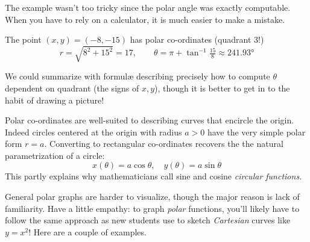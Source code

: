 The example wasn't too tricky since the polar angle was exactly computable. When you have to rely on a calculator, it is much easier to make a mistake.

\begin{example}{}{}
	The point $(x,y)=(-8,-15)$ has polar co-ordinates (quadrant 3!)
	\[
		r=\sqrt{8^2+15^2}=17,\qquad \theta=\pi+\tan^{-1}\tfrac{15}8\approx \ang{241.93}
	\]
\end{example}


We could summarize with formulæ describing precisely how to compute $\theta$ dependent on quadrant (the signs of $x,y$), though it is better to get in to the habit of drawing a picture!

\goodbreak



Polar co-ordinates are well-suited to describing curves that encircle the origin. Indeed circles centered at the origin with radius $a>0$ have the very simple polar form $r=a$. Converting to rectangular co-ordinates recovers the the natural parametrization of a circle:
\[
	x(\theta)=a\cos\theta,\quad y(\theta)=a\sin\theta
\]
This partly explains why mathematicians call sine and cosine \emph{circular functions.}\smallbreak

General polar graphs are harder to visualize, though the major reason is lack of familiarity. Have a little empathy: to graph \emph{polar} functions, you'll likely have to follow the same approach as new students use to sketch \emph{Cartesian} curves like $y=x^2$! Here are a couple of examples.

